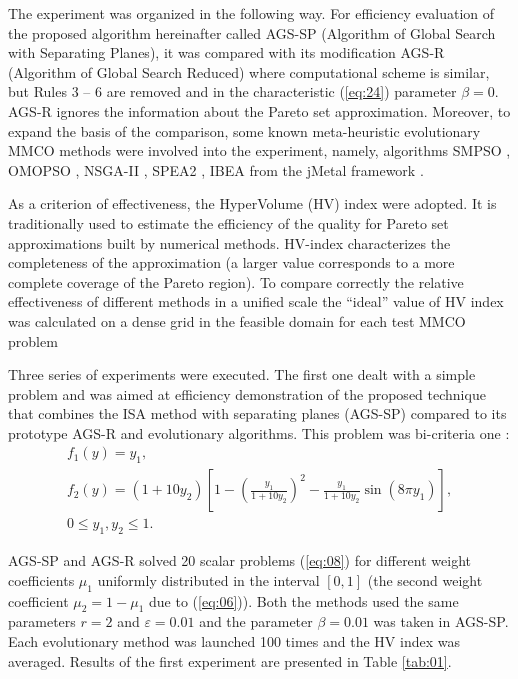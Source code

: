 \documentclass[runningheads]{llncs}
\begin{document}
The experiment was organized in the following way. For efficiency evaluation of the proposed algorithm hereinafter called AGS-SP (Algorithm of Global Search with Separating Planes), it was compared with its modification AGS-R (Algorithm of Global Search Reduced) where computational scheme is similar, but Rules 3 -- 6 are removed and in the characteristic (\ref{eq:24}) parameter $\beta = 0$. AGS-R ignores the information about the Pareto set approximation. Moreover, to expand the basis of the comparison, some known meta-heuristic evolutionary MMCO methods were involved into the experiment, namely, algorithms SMPSO \cite{NDG09}, OMOPSO \cite{RC05}, NSGA-II \cite{DPA02}, SPEA2 \cite{ZLT01}, IBEA \cite{ZK04} from the jMetal framework \cite{DNA10}.

As a criterion of effectiveness, the HyperVolume (HV) index \cite{Evtushenko2014,Gergel2018} were adopted. It is traditionally used to estimate the efficiency of the quality for Pareto set approximations built by numerical methods. HV-index characterizes the completeness of the approximation (a larger value corresponds to a more complete coverage of the Pareto region). To compare correctly the relative effectiveness of different methods in a unified scale the ``ideal'' value of HV index was calculated on a dense grid in the feasible domain for each test MMCO problem

Three series of experiments were executed. The first one dealt with a simple problem and was aimed at efficiency demonstration of the proposed technique that combines the ISA method with separating planes (AGS-SP) compared to its prototype AGS-R and evolutionary algorithms.
This problem was bi-criteria one \cite{CHIANDUSSI2012912}:
\begin{equation}
    \label{eq:28}
    \begin{matrix}
f_1 (y)=y_1, \\
f_2 (y)=(1+10y_2 )[1- \left(\frac{y_1}{1+10y_2} \right)^2- \frac{y_1}{1+10y_2} \sin(8 \pi y_1 ) ], \\
0 \leq y_1,y_2 \leq 1.
    \end{matrix}
\end{equation}

AGS-SP and AGS-R solved 20 scalar problems (\ref{eq:08}) for different weight coefficients $\mu_1$ uniformly distributed in the interval $[0,1]$ (the second weight coefficient $\mu_2=1-\mu_1$ due to (\ref{eq:06})). Both the methods used the same parameters $r=2$ and $\varepsilon=0.01$ and the parameter $\beta=0.01$ was taken in AGS-SP. Each evolutionary method was launched 100 times and the HV index was averaged.
Results of the first experiment are presented in Table \ref{tab:01}.
\end{document}
